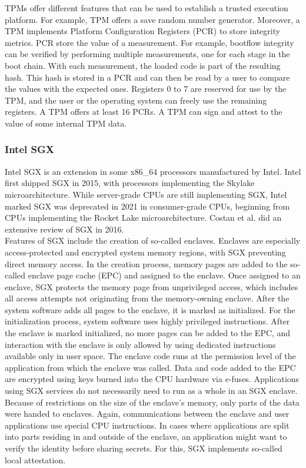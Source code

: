 TPMs offer different features that can be used to establish a trusted execution
platform. For example, TPM offers a save random number generator. Moreover, a
TPM implements Platform Configuration Registers (PCR) to store integrity
metrics. PCR store the value of a measurement. For example, bootflow integrity
can be verified by performing multiple measurements, one for each stage in the
boot chain. With each measurement, the loaded code is part of the resulting
hash. This hash is stored in a PCR and can then be read by a user to compare the
values with the expected ones. Registers 0 to 7 are reserved for use by the TPM,
and the user or the operating system can freely use the remaining registers. A
TPM offers at least 16 PCRs. A TPM can sign and attest to the value of some
internal TPM data. \\

\subsubsection{Intel SGX}
\label{sec:20:sgx}
Intel SGX is an extension in some x86\_64 processors manufactured by Intel.
Intel first shipped SGX in 2015, with processors implementing the Skylake
microarchitecture. While server-grade CPUs are still implementing SGX, Intel
marked SGX was deprecated in 2021 in consumer-grade CPUs, beginning from CPUs
implementing the Rocket Lake microarchitecture. Costan et al. did an extensive
review of SGX in 2016.\cite{costan2016intel} \\

Features of SGX include the creation of so-called enclaves. Enclaves are
especially access-protected and encrypted system memory regions, with SGX
preventing direct memory access. In the creation process, memory pages are added
to the so-called enclave page cache (EPC) and assigned to the enclave. Once
assigned to an enclave, SGX protects the memory page from unprivileged access,
which includes all access attempts not originating from the memory-owning
enclave. After the system software adds all pages to the enclave, it is marked
as initialized. For the initialization process, system software uses highly
privileged instructions. After the enclave is marked initialized, no more pages
can be added to the EPC, and interaction with the enclave is only allowed by
using dedicated instructions available only in user space. The enclave code runs
at the permission level of the application from which the enclave was called.
Data and code added to the EPC are encrypted using keys burned into the CPU
hardware via e-fuses. Applications using SGX services do not necessarily need to
run as a whole in an SGX enclave. Because of restrictions on the size of the
enclave's memory, only parts of the data were handed to enclaves. Again,
communications between the enclave and user applications use special CPU
instructions. In cases where applications are split into parts residing in and
outside of the enclave, an application might want to verify the identity before
sharing secrets. For this, SGX implements so-called local attestation.\\

